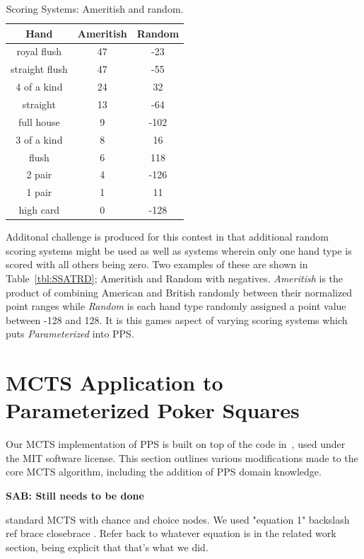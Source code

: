 \documentclass[letterpaper]{article}
\begin{document}
\begin{table}
\caption{Scoring Systems: Ameritish and random.}
\label{tbl:SSAMBR}
\centering
\begin{tabular}{c c c}
\hline
Hand & Ameritish & Random \\
\hline
royal flush & 47 & -23 \\
straight flush & 47 & -55 \\
4 of a kind & 24 & 32 \\
straight & 13 & -64 \\
full house & 9 & -102 \\
3 of a kind & 8 & 16 \\
flush & 6 & 118 \\
2 pair & 4 & -126 \\
1 pair & 1 & 11 \\
high card & 0 & -128 \\
\hline
\end{tabular}
\end{table}

Additonal challenge is produced for this contest in that additional random scoring systems might be used as well as systems wherein only one hand type is scored with all others being zero. Two examples of these are shown in Table~\ref{tbl:SSATRD}; Ameritish and Random with negatives. \emph{Ameritish} is the product of combining American and British randomly between their normalized point ranges while \emph{Random} is each hand type randomly assigned a point value between -128 and 128. It is this games aspect of varying scoring systems which puts \emph{Parameterized} into PPS.

\section{MCTS Application to Parameterized Poker Squares}

Our MCTS implementation of PPS is built on top of the code in~\cite{hughart2012uct}, used under the MIT software license. This section outlines various modifications made to the core MCTS algorithm, including the addition of PPS domain knowledge.

{\bf SAB: Still needs to be done}

standard MCTS with chance and choice nodes. We used "equation 1"   backslash ref brace  closebrace   . Refer back to whatever equation is in the related work section, being explicit that that's what we did.
\end{document}
